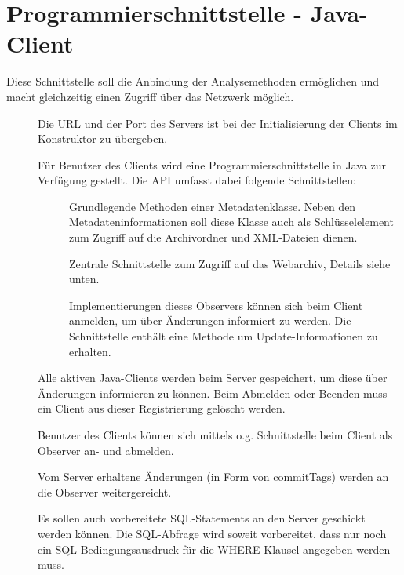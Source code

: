 \section{Programmierschnittstelle - Java-Client}\label{spec:client}
	Diese Schnittstelle soll die Anbindung der Analysemethoden ermöglichen und 
	macht gleichzeitig einen Zugriff über das Netzwerk möglich.
\begin{description}
	\item []
		Die URL und der Port des Servers ist bei der Initialisierung der Clients im Konstruktor zu übergeben.
	\item []
		Für Benutzer des Clients wird eine Programmierschnittstelle in Java zur Verfügung gestellt.
		Die API umfasst dabei folgende Schnittstellen:
		\begin{description}
			\item []
				Grundlegende Methoden einer Metadatenklasse.
				Neben den Metadateninformationen soll diese Klasse auch als
				Schlüsselelement zum Zugriff auf die Archivordner und XML-Dateien dienen.
			\item []
				Zentrale Schnittstelle zum Zugriff auf das Webarchiv, Details siehe unten.
			\item []
				Implementierungen dieses Observers können sich beim Client anmelden, 
				um über Änderungen informiert zu werden. 
				Die Schnittstelle enthält eine Methode um Update-Informationen zu erhalten.
		\end{description}
	\item []
		Alle aktiven Java-Clients werden beim Server gespeichert, 
		um diese über Änderungen informieren zu können.
		Beim Abmelden oder Beenden muss ein Client aus dieser Registrierung gelöscht werden.
	\item []
		Benutzer des Clients können sich mittels o.g. Schnittstelle beim Client als Observer an- und abmelden.
	\item []
		Vom Server erhaltene Änderungen (in Form von commitTags) werden an die Observer weitergereicht.
	\item []
		Es sollen auch vorbereitete SQL-Statements an den Server geschickt werden können. 
		Die SQL-Abfrage wird soweit vorbereitet, 
		dass nur noch ein SQL-Bedingungsausdruck für die WHERE-Klausel angegeben werden muss.

\end{description}
